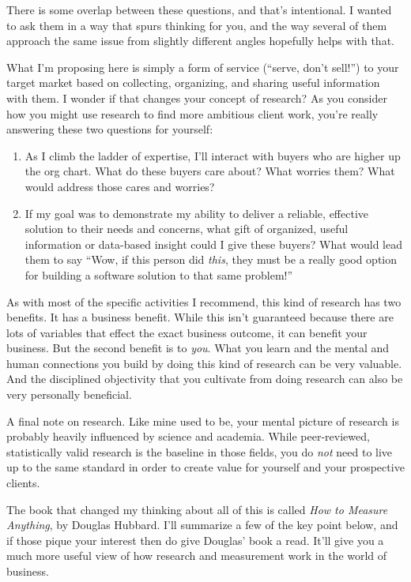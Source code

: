 There is some overlap between these questions, and that's intentional. I wanted to ask them in a way that spurs thinking for you, and the way several of them approach the same issue from slightly different angles hopefully helps with that.

What I'm proposing here is simply a form of service (“serve, don’t sell!”) to your target market based on collecting, organizing, and sharing useful information with them. I wonder if that changes your concept of research? As you consider how you might use research to find more ambitious client work, you're really answering these two questions for yourself:

\begin{enumerate}
\item As I climb the ladder of expertise, I'll interact with buyers who are higher up the org chart. What do these buyers care about? What worries them? What would address those cares and worries?
\item If my goal was to demonstrate my ability to deliver a reliable, effective solution to their needs and concerns, what gift of organized, useful information or data-based insight could I give these buyers? What would lead them to say ``Wow, if this person did \emph{this}, they must be a really good option for building a software solution to that same problem!''
\end{enumerate}

As with most of the specific activities I recommend, this kind of research has two benefits. It has a business benefit. While this isn't guaranteed because there are lots of variables that effect the exact business outcome, it can benefit your business. But the second benefit is to \emph{you}. What you learn and the mental and human connections you build by doing this kind of research can be very valuable. And the disciplined objectivity that you cultivate from doing research can also be very personally beneficial.

A final note on research. Like mine used to be, your mental picture of research is probably heavily influenced by science and academia. While peer-reviewed, statistically valid research is the baseline in those fields, you do \emph{not} need to live up to the same standard in order to create value for yourself and your prospective clients.

The book that changed my thinking about all of this is called \emph{How to Measure Anything}, by Douglas Hubbard. I'll summarize a few of the key point below, and if those pique your interest then do give Douglas' book a read. It'll give you a much more useful view of how research and measurement work in the world of business.

